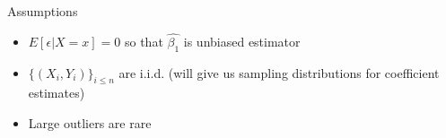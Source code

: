 \documentclass[aspectratio=169]{beamer}
\begin{document}
\begin{frame}{Assumptions}
    \begin{itemize}
        \item $E[\epsilon | X=x] = 0$ so that $\hat{\beta_1}$ is unbiased estimator
        \item $\{ (X_i, Y_i) \}_{i \leq n}$ are i.i.d. (will give us sampling distributions for coefficient estimates)
        \item Large outliers are rare
    \end{itemize}
\end{frame}
\end{document}
